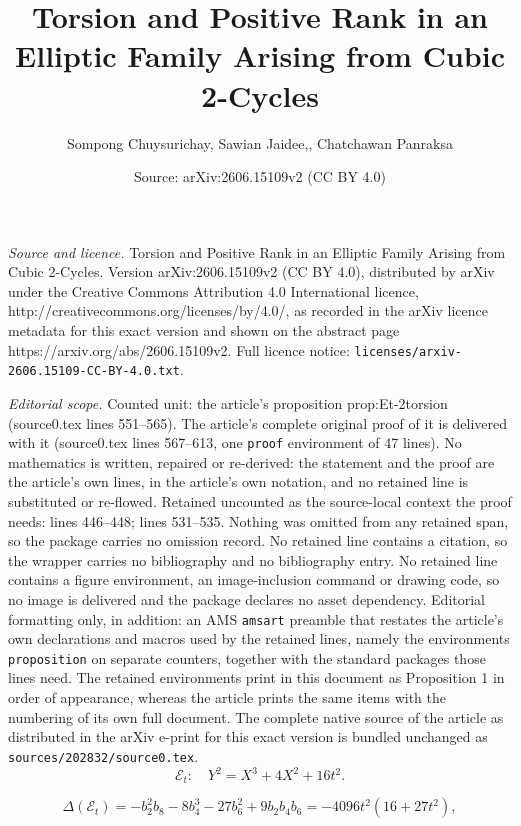 \documentclass[10pt,a4paper]{amsart}
\title{Torsion and Positive Rank in an Elliptic Family Arising from Cubic 2-Cycles}
\author{Sompong Chuysurichay, Sawian Jaidee,, Chatchawan Panraksa}
\date{Source: arXiv:2606.15109v2 (CC BY 4.0)}
\newcommand{\mathcalE}{\mathcal{E}}
\begin{document}
\maketitle

\noindent\emph{Source and licence.} Torsion and Positive Rank in an Elliptic Family Arising from Cubic 2-Cycles. Version arXiv:2606.15109v2 (CC BY 4.0), distributed by arXiv under the Creative Commons Attribution 4.0 International licence, http://creativecommons.org/licenses/by/4.0/, as recorded in the arXiv licence metadata for this exact version and shown on the abstract page https://arxiv.org/abs/2606.15109v2. Full licence notice: \texttt{licenses/arxiv-2606.15109-CC-BY-4.0.txt}.\par\smallskip

\noindent\textit{Editorial scope.} Counted unit: the article's proposition prop:Et-2torsion (source0.tex lines 551--565). The article's complete original proof of it is delivered with it (source0.tex lines 567--613, one \texttt{proof} environment of 47 lines). No mathematics is written, repaired or re-derived: the statement and the proof are the article's own lines, in the article's own notation, and no retained line is substituted or re-flowed.  Retained uncounted as the source-local context the proof needs: lines 446--448; lines 531--535.  Nothing was omitted from any retained span, so the package carries no omission record.  No retained line contains a citation, so the wrapper carries no bibliography and no bibliography entry.  No retained line contains a figure environment, an image-inclusion command or drawing code, so no image is delivered and the package declares no asset dependency.  Editorial formatting only, in addition: an AMS \texttt{amsart} preamble that restates the article's own declarations and macros used by the retained lines, namely the environments \texttt{proposition} on separate counters, together with the standard packages those lines need.  The retained environments print in this document as Proposition 1 in order of appearance, whereas the article prints the same items with the numbering of its own full document.  The complete native source of the article as distributed in the arXiv e-print for this exact version is bundled unchanged as \texttt{sources/202832/source0.tex}.
\begin{equation}\label{eq:Et-family}
\mathcalE_t:\quad Y^2=X^3+4X^2+16t^2.
\end{equation}

\begin{equation}\label{eq:Et-discriminant}
\Delta(\mathcalE_t)
=-b_2^2b_8-8b_4^3-27b_6^2+9b_2b_4b_6
=-4096t^2(16+27t^2),
\end{equation}
\end{document}
